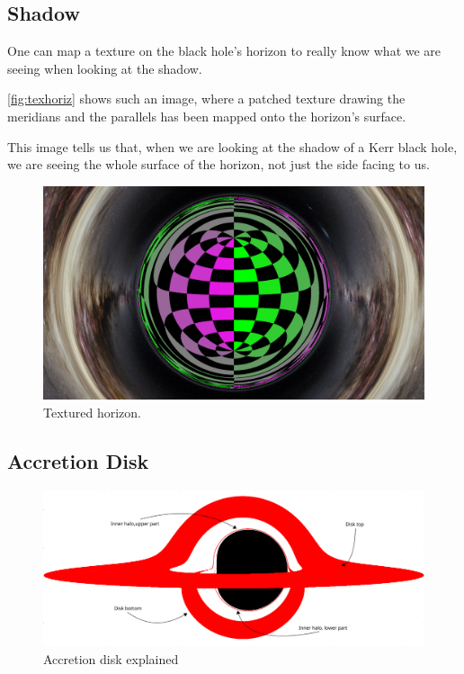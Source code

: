 \subsection{Shadow}

One can map a texture on the black hole's horizon to really know what we are seeing when looking at the shadow.

\autoref{fig:texhoriz} shows such an image, where a patched texture drawing the meridians and the parallels has been mapped onto the horizon's surface.

This image tells us that, when we are looking at the shadow of a Kerr black hole, we are seeing the whole surface of the horizon, not just the side facing to us.

\begin{figure}[bth]
	\myfloatalign
	\includegraphics[width=.8\linewidth]{gfx/gridhorizon}
	\caption[Textured horizon]{Textured horizon.}
	\label{fig:texhoriz}
\end{figure}

\subsection{Accretion Disk}

\begin{figure}[bth]
	\myfloatalign
	\includegraphics[width=\linewidth]{gfx/bh_simple}
	\caption[Accretion disk explained]{Accretion disk explained}
	\label{fig:explanation}
\end{figure}


